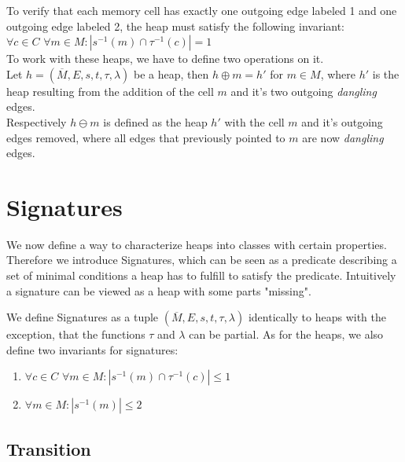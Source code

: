 \noindent
To verify that each memory cell has exactly one outgoing edge labeled 1 and one outgoing edge labeled 2, the heap must satisfy
the following invariant:\\

$\forall c \in C$ $\forall m \in M : |s^{-1}(m) \cap \tau^{-1}(c)| = 1$ \\

\noindent
To work with these heaps, we have to define two operations on it. \\
Let $h = (\overline{M}, E, s, t, \tau, \lambda)$ be a heap, 
then $h \oplus m = h'$ for $m \in M$, where $h'$ is the heap resulting from the addition of the cell $m$ and it's two
outgoing \textit{dangling} edges.\\
Respectively $h \ominus m$ is defined as the heap $h'$ with the cell $m$ and it's outgoing edges removed, where
all edges that previously pointed to $m$ are now \textit{dangling} edges.

\newpage
\section{Signatures}

We now define a way to characterize heaps into classes with certain properties.
Therefore we introduce Signatures, which can be seen as a predicate describing a set of minimal
conditions a heap has to fulfill to satisfy the predicate. 
Intuitively a signature can be viewed as a heap with some parts "missing". 

\noindent
We define Signatures as a tuple $(\overline{M}, E, s, t, \tau, \lambda)$ identically to heaps with the exception,
that the functions $\tau$ and $\lambda$ can be partial. As for the heaps, we also define two invariants for
signatures:

\begin{enumerate}

	\item $\forall c \in C$ $\forall m \in M : |s^{-1}(m) \cap \tau^{-1}(c)| \le 1$
	\item $\forall m \in M : |s^{-1}(m)| \le 2$

\end{enumerate}

\subsection{Transition}

